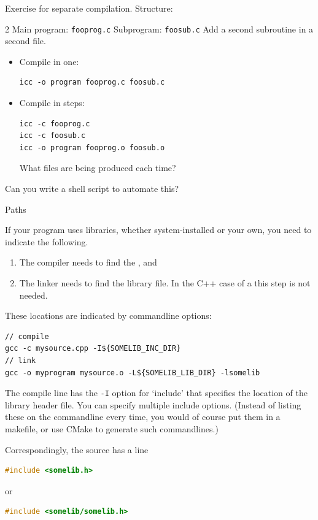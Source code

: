 \begin{exercise}
  \label{ex:compile3}

  Exercise for separate compilation. Structure:
\begin{multicols}{2}
  Main program: \lstinline{fooprog.c}
  \columnbreak
  Subprogram: \lstinline{foosub.c}
  Add a second subroutine in a second file.
\end{multicols}

  \begin{itemize}
  \item Compile in one:
\begin{lstlisting}
icc -o program fooprog.c foosub.c
\end{lstlisting}
\item Compile in steps:
\begin{lstlisting}
icc -c fooprog.c
icc -c foosub.c
icc -o program fooprog.o foosub.o
\end{lstlisting}
What files are being produced each time?
  \end{itemize}
Can you write a shell script to automate this?
\end{exercise}

 {Paths}


If your program uses libraries, whether system-installed or your own,
you need to indicate the following.
\begin{enumerate}
\item The compiler needs to find the
  , and
\item The linker needs to find the library file.
  In the C++ case of a  this step is not needed.
\end{enumerate}
These locations are indicated by commandline options:
\begin{lstlisting}
// compile
gcc -c mysource.cpp -I${SOMELIB_INC_DIR}
// link
gcc -o myprogram mysource.o -L${SOMELIB_LIB_DIR} -lsomelib
\end{lstlisting}
The compile line has the \lstinline{-I} option for `include' that specifies
the location of the library header file.
You can specify multiple include options.
(Instead of listing these on the commandline every time,
you would of course put them in a makefile, or use CMake to
generate such commandlines.)

Correspondingly, the source has a line
\begin{lstlisting}[language=cpp]
#include <somelib.h>
\end{lstlisting}
or
\begin{lstlisting}[language=cpp]
#include <somelib/somelib.h>
\end{lstlisting}

